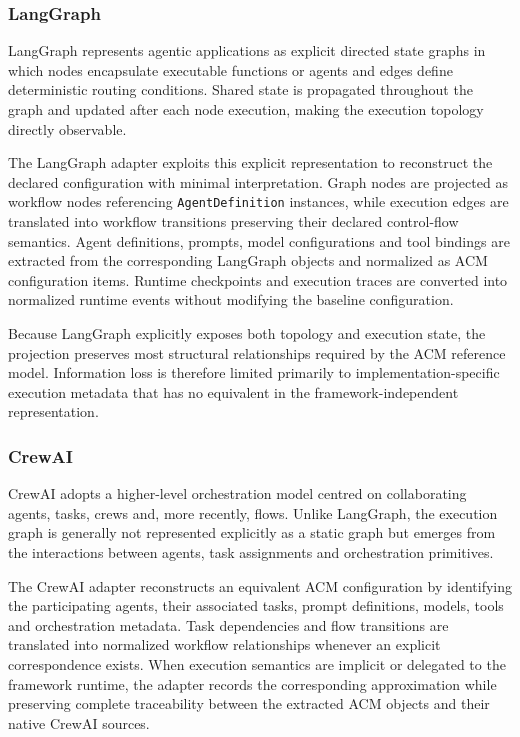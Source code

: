 \documentclass[10pt]{article}
\begin{document}
\subsubsection{LangGraph}

LangGraph represents agentic applications as explicit directed state graphs in which nodes encapsulate executable functions or agents and edges define deterministic routing conditions. Shared state is propagated throughout the graph and updated after each node execution, making the execution topology directly observable.

The LangGraph adapter exploits this explicit representation to reconstruct the declared configuration with minimal interpretation. Graph nodes are projected as workflow nodes referencing \texttt{AgentDefinition} instances, while execution edges are translated into workflow transitions preserving their declared control-flow semantics. Agent definitions, prompts, model configurations and tool bindings are extracted from the corresponding LangGraph objects and normalized as ACM configuration items. Runtime checkpoints and execution traces are converted into normalized runtime events without modifying the baseline configuration.

Because LangGraph explicitly exposes both topology and execution state, the projection preserves most structural relationships required by the ACM reference model. Information loss is therefore limited primarily to implementation-specific execution metadata that has no equivalent in the framework-independent representation.

\subsubsection{CrewAI}

CrewAI adopts a higher-level orchestration model centred on collaborating agents, tasks, crews and, more recently, flows. Unlike LangGraph, the execution graph is generally not represented explicitly as a static graph but emerges from the interactions between agents, task assignments and orchestration primitives.

The CrewAI adapter reconstructs an equivalent ACM configuration by identifying the participating agents, their associated tasks, prompt definitions, models, tools and orchestration metadata. Task dependencies and flow transitions are translated into normalized workflow relationships whenever an explicit correspondence exists. When execution semantics are implicit or delegated to the framework runtime, the adapter records the corresponding approximation while preserving complete traceability between the extracted ACM objects and their native CrewAI sources.
\end{document}
